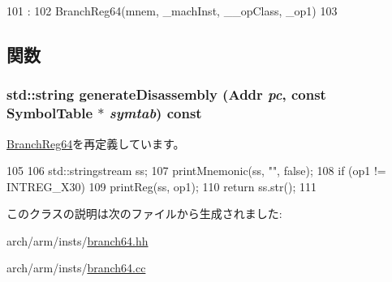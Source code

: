 \begin{DoxyCode}
101                                   :
102         BranchReg64(mnem, _machInst, __opClass, _op1)
103     {}

\end{DoxyCode}


\subsection{関数}
\hypertarget{classArmISA_1_1BranchRet64_a95d323a22a5f07e14d6b4c9385a91896}{
\subsubsection[{generateDisassembly}]{\setlength{\rightskip}{0pt plus 5cm}std::string generateDisassembly ({\bf Addr} {\em pc}, \/  const SymbolTable $\ast$ {\em symtab}) const}}
\label{classArmISA_1_1BranchRet64_a95d323a22a5f07e14d6b4c9385a91896}


\hyperlink{classArmISA_1_1BranchReg64_a95d323a22a5f07e14d6b4c9385a91896}{BranchReg64}を再定義しています。


\begin{DoxyCode}
105 {
106     std::stringstream ss;
107     printMnemonic(ss, "", false);
108     if (op1 != INTREG_X30)
109         printReg(ss, op1);
110     return ss.str();
111 }
\end{DoxyCode}


このクラスの説明は次のファイルから生成されました:\begin{DoxyCompactItemize}
\item 
arch/arm/insts/\hyperlink{branch64_8hh}{branch64.hh}\item 
arch/arm/insts/\hyperlink{branch64_8cc}{branch64.cc}\end{DoxyCompactItemize}
